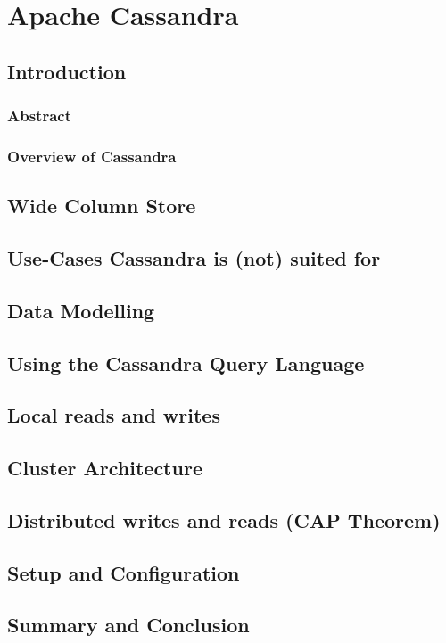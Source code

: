 \chapter{Apache Cassandra}

\section{Introduction}
\subsection{Abstract}
\subsection{Overview of Cassandra}

\section{Wide Column Store}

\section{Use-Cases Cassandra is (not) suited for}  %

\section{Data Modelling}  %

\section{Using the Cassandra Query Language}  %

\section{Local reads and writes}

\section{Cluster Architecture}  %

\section{Distributed writes and reads (CAP Theorem)}

\section{Setup and Configuration}  %

\section{Summary and Conclusion}
